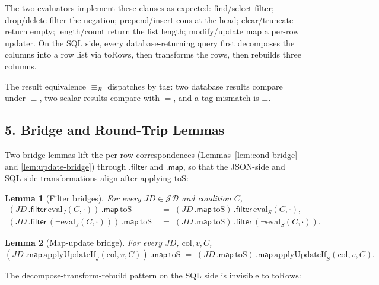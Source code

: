 \documentclass{article}
\newtheorem{lemma}{Lemma}
\begin{document}
The two evaluators implement these clauses as expected: \textsf{find}/\textsf{select} filter; \textsf{drop}/\textsf{delete} filter the negation; \textsf{prepend}/\textsf{insert} cons at the head; \textsf{clear}/\textsf{truncate} return empty; \textsf{length}/\textsf{count} return the list length; \textsf{modify}/\textsf{update} map a per-row updater. On the SQL side, every database-returning query first decomposes the columns into a row list via $\mathrm{toRows}$, then transforms the rows, then rebuilds three columns.

The result equivalence $\equiv_R$ dispatches by tag: two database results compare under $\equiv$, two scalar results compare with $=$, and a tag mismatch is $\bot$.

\subsection*{5. Bridge and Round-Trip Lemmas}

Two bridge lemmas lift the per-row correspondences (Lemmas~\ref{lem:cond-bridge} and \ref{lem:update-bridge}) through $\textsf{.filter}$ and $\textsf{.map}$, so that the JSON-side and SQL-side transformations align after applying $\mathrm{toS}$:

\begin{lemma}[Filter bridges]
\label{lem:filter-bridge}
For every $JD \in \mathcal{JD}$ and condition $C$,
\begin{align*}
(JD\,\textsf{.filter}\,\mathrm{eval}_J(C, \cdot))\,\textsf{.map}\,\mathrm{toS}
&\;=\; (JD\,\textsf{.map}\,\mathrm{toS})\,\textsf{.filter}\,\mathrm{eval}_S(C, \cdot), \\
(JD\,\textsf{.filter}\,(\lnot \mathrm{eval}_J(C, \cdot)))\,\textsf{.map}\,\mathrm{toS}
&\;=\; (JD\,\textsf{.map}\,\mathrm{toS})\,\textsf{.filter}\,(\lnot \mathrm{eval}_S(C, \cdot)).
\end{align*}
\end{lemma}

\begin{lemma}[Map-update bridge]
\label{lem:map-update}
For every $JD$, $\mathrm{col}, v, C$,
\[
(JD\,\textsf{.map}\,\mathrm{applyUpdateIf}_J(\mathrm{col}, v, C))\,\textsf{.map}\,\mathrm{toS}
\;=\; (JD\,\textsf{.map}\,\mathrm{toS})\,\textsf{.map}\,\mathrm{applyUpdateIf}_S(\mathrm{col}, v, C).
\]
\end{lemma}

The decompose-transform-rebuild pattern on the SQL side is invisible to $\mathrm{toRows}$:
\end{document}
